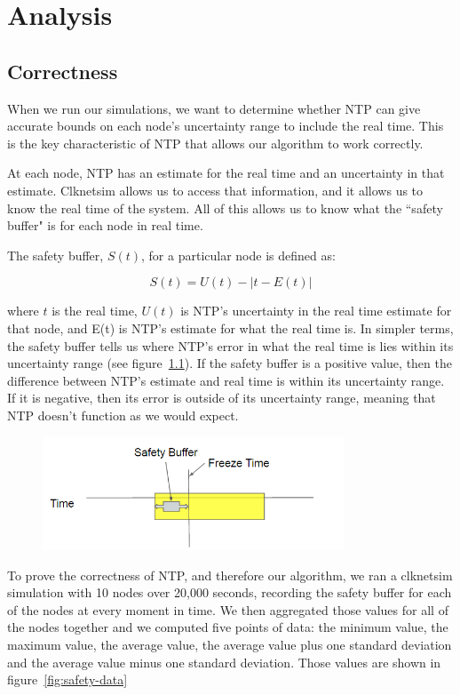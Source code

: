 \chapter{Analysis}
\label{sec:analysis}

\section{Correctness}

When we run our simulations, we want to determine whether NTP can give
accurate bounds on each node's uncertainty range to include the real
time. This is the key characteristic of NTP that allows our algorithm
to work correctly.

At each node, NTP has an estimate for the real time and an uncertainty
in that estimate. Clknetsim allows us to access that information, and
it allows us to know the real time of the system. All of this allows
us to know what the ``safety buffer" is for each node in real time.

The safety buffer, $S(t)$,  for a particular node is defined as:

\[ S(t) = U(t) - | t - E(t)| \]

where $t$ is the real time, $U(t)$ is NTP's uncertainty in the real
time estimate for that node, and E(t) is NTP's estimate for what the
real time is. In simpler terms, the safety buffer tells us where NTP's
error in what the real time is lies within its uncertainty range (see
figure~\ref{fig:safety-diag}). If the safety buffer is a positive
value, then the difference between NTP's estimate and real time is
within its uncertainty range. If it is negative, then its error is
outside of its uncertainty range, meaning that NTP doesn't function as
we would expect.

\begin{figure}[h]
  \caption{} %
  \label{fig:safety-diag}
  \centering
  \includegraphics[width=0.8\textwidth]{safety-diagram.png}
\end{figure}

To prove the correctness of NTP, and therefore our algorithm, we ran a
clknetsim simulation with 10 nodes over 20,000 seconds, 
recording the safety buffer for each of the nodes at
every moment in time. We then aggregated those values for all of the
nodes together and we computed five points of data: the minimum value,
the maximum value, the average value, the average value plus one
standard deviation and the average value minus one standard
deviation. Those values are shown in figure~\ref{fig:safety-data}

